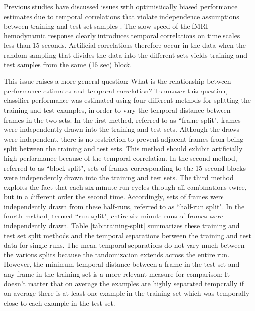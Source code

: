 \documentclass[review,1p,authoryear]{elsarticle}
\begin{document}
Previous studies have discussed issues with optimistically biased performance estimates due to temporal correlations that violate independence assumptions between training and test set samples \citep{Pereira2009}. 
The slow speed of the fMRI hemodynamic response clearly introduces temporal correlations on time scales less than 15 seconds.
Artificial correlations therefore occur in the data when the random sampling that divides the data into the different sets yields training and test samples from the same (15 sec) block.

This issue raises a more general question: What is the relationship between performance estimates and temporal correlation?
To answer this question, classifier performance was estimated using four different methods for splitting the training and test examples, in order to vary the temporal distance between frames in the two sets. 
In the first method, referred to as  ``frame split", frames were independently drawn into the training and test sets. 
Although the draws were independent, there is no restriction to prevent adjacent frames from being split between the training and test sets.
This method should exhibit artificially high performance because of the temporal correlation.
In the second method, referred to as ``block split", sets of frames corresponding to the 15 second blocks were independently drawn into the training and test sets.
The third method exploits the fact that each six minute run cycles through all combinations twice, but in a different order the second time.
Accordingly, sets of frames were independently drawn from these half-runs, referred to as ``half-run split". 
In the fourth method, termed ``run split", entire six-minute runs of frames were independently drawn. 
Table \ref{tab:training-split} summarizes these training and test set split methods and the temporal separations between the training and test data for single runs. 
The mean temporal separations do not vary much between the various splits because the randomization extends across the entire run. 
However, the minimum temporal distance between a frame in the test set and any frame in the training set is a more relevant measure for comparison: It doesn't matter that on average the examples are highly separated temporally if on average there is at least one example in the training set which was temporally close to each example in the test set.
\end{document}
